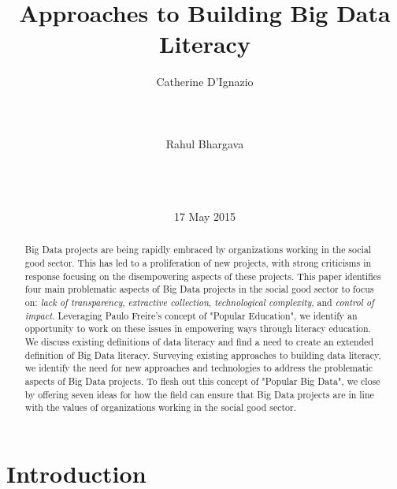 \documentclass{sig-alternate}
\begin{document}
\title{Approaches to Building Big Data Literacy}

\author{
\alignauthor
Catherine D'Ignazio\\
       \\
       \\
       \\
\alignauthor
Rahul Bhargava\\
       \\
       \\
       \\
}

\date{17 May 2015}

\maketitle
\begin{abstract}
Big Data projects are being rapidly embraced by organizations working in the social good sector.  This has led to a proliferation of new projects, with strong criticisms in response focusing on the disempowering aspects of these projects.  This paper identifies four main problematic aspects of Big Data projects in the social good sector to focus on: \textit{lack of transparency}, \textit{extractive collection}, \textit{technological complexity}, and \textit{control of impact}. Leveraging Paulo Freire's concept of "Popular Education", we identify an opportunity to work on these issues in empowering ways through literacy education.  We discuss existing definitions of data literacy and find a need to create an extended definition of Big Data literacy. Surveying existing approaches to building data literacy, we identify the need for new approaches and technologies to address the problematic aspects of Big Data projects. To flesh out this concept of "Popular Big Data", we close by offering seven ideas for how the field can ensure that Big Data projects are in line with the values of organizations working in the social good sector. 
\end{abstract}

\section{Introduction}
\end{document}

